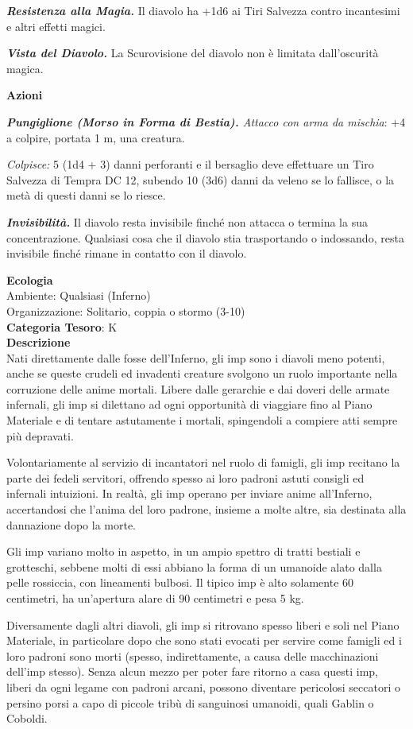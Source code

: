 \begin{multicols}{2}
{\emph{\textbf{Resistenza alla Magia.}} Il diavolo ha +1d6 ai Tiri Salvezza contro incantesimi e altri effetti magici.

\emph{\textbf{Vista del Diavolo.}} La Scurovisione del diavolo non è limitata dall'oscurità magica.

\textbf{Azioni}

\emph{\textbf{Pungiglione (Morso in Forma di Bestia).} Attacco con arma da mischia}: +4 a colpire, portata 1 m, una creatura.

\emph{Colpisce:} 5 (1d4 + 3) danni perforanti e il bersaglio deve effettuare un Tiro Salvezza di Tempra DC 12, subendo 10 (3d6) danni da veleno se lo fallisce, o la metà di questi danni se lo riesce.

\emph{\textbf{Invisibilità.}} Il diavolo resta invisibile finché non attacca o termina la sua concentrazione. Qualsiasi cosa che il diavolo stia trasportando o indossando, resta invisibile finché rimane in contatto con il diavolo.

\textbf{Ecologia}\\
Ambiente: Qualsiasi (Inferno)\\
Organizzazione: Solitario, coppia o stormo (3-10)\\
\textbf{Categoria Tesoro}: K\\
\textbf{Descrizione}\\
Nati direttamente dalle fosse dell'Inferno, gli imp sono i diavoli meno potenti, anche se queste crudeli ed invadenti creature svolgono un ruolo importante nella corruzione delle anime mortali. Libere dalle gerarchie e dai doveri delle armate infernali, gli imp si dilettano ad ogni opportunità di viaggiare fino al Piano Materiale e di tentare astutamente i mortali, spingendoli a compiere atti sempre più depravati.

Volontariamente al servizio di incantatori nel ruolo di famigli, gli imp recitano la parte dei fedeli servitori, offrendo spesso ai loro padroni astuti consigli ed infernali intuizioni. In realtà, gli imp operano per inviare anime all'Inferno, accertandosi che l'anima del loro padrone, insieme a molte altre, sia destinata alla dannazione dopo la morte.

Gli imp variano molto in aspetto, in un ampio spettro di tratti bestiali e grotteschi, sebbene molti di essi abbiano la forma di un umanoide alato dalla pelle rossiccia, con lineamenti bulbosi. Il tipico imp è alto solamente 60 centimetri, ha un'apertura alare di 90 centimetri e pesa 5 kg.

Diversamente dagli altri diavoli, gli imp si ritrovano spesso liberi e soli nel Piano Materiale, in particolare dopo che sono stati evocati per servire come famigli ed i loro padroni sono morti (spesso, indirettamente, a causa delle macchinazioni dell'imp stesso). Senza alcun mezzo per poter fare ritorno a casa questi imp, liberi da ogni legame con padroni arcani, possono diventare pericolosi seccatori o persino porsi a capo di piccole tribù di sanguinosi umanoidi, quali Gablin o Coboldi.

}
\end{multicols}
